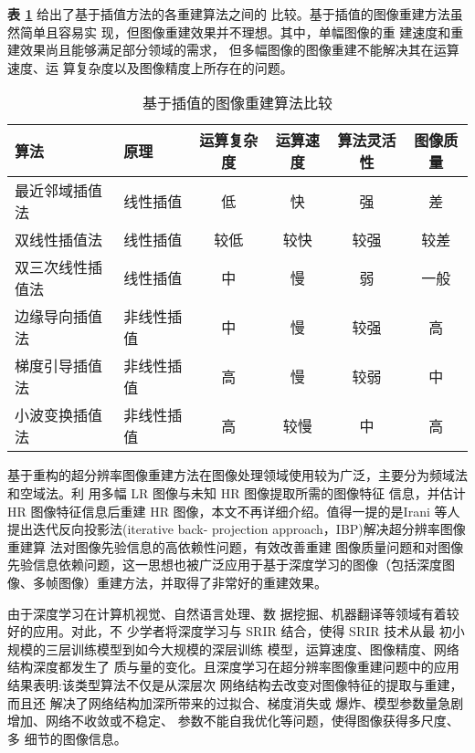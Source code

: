 \textbf{表 \ref{tab:tab1}} 给出了基于插值方法的各重建算法之间的 比较。基于插值的图像重建方法虽然简单且容易实 现，但图像重建效果并不理想。其中，单幅图像的重 建速度和重建效果尚且能够满足部分领域的需求， 但多幅图像的图像重建不能解决其在运算速度、运 算复杂度以及图像精度上所存在的问题。

\begin{table}[!ht]
\centering
\caption{基于插值的图像重建算法比较}
\begin{adjustbox}{width=\linewidth}
\begin{tabular}{llcccc}
\toprule
	算法 &  原理 &  运算复杂度 &  运算速度 &  算法灵活性 &  图像质量 \\ \hline
	 最近邻域插值法 &  线性插值 &  低 &  快 &  强 &  差 \\ \hline
	 双线性插值法 &  线性插值 &  较低 &  较快 &  较强 &  较差 \\ \hline
	 双三次线性插值法 &  线性插值 &  中 &  慢 &  弱 &  一般 \\ \hline
	 边缘导向插值法 &  非线性插值 &  中 &  慢 &  较强 &  高 \\ \hline
	 梯度引导插值法 &  非线性插值 &  高 &  慢 &  较弱 &  中 \\ \hline
	 小波变换插值法 &  非线性插值 &  高 &  较慢 &  中 &  高 \\ \bottomrule
\end{tabular}
\end{adjustbox}
\label{tab:tab1}
\end{table}

基于重构的超分辨率图像重建方法在图像处理领域使用较为广泛，主要分为频域法和空域法。利 用多幅 LR 图像与未知 HR 图像提取所需的图像特征 信息，并估计 HR 图像特征信息后重建 HR 图像，本文不再详细介绍。值得一提的是Irani 等人 \cite{DBLP:journals/cvgip/IraniP91}提出迭代反向投影法(iterative back- projection approach，IBP)解决超分辨率图像重建算 法对图像先验信息的高依赖性问题，有效改善重建 图像质量问题和对图像先验信息依赖问题，这一思想也被广泛应用于基于深度学习的图像（包括深度图像、多帧图像）重建方法，并取得了非常好的重建效果。

由于深度学习在计算机视觉、自然语言处理、数 据挖掘、机器翻译等领域有着较好的应用。对此，不 少学者将深度学习与 SRIR 结合，使得 SRIR 技术从最 初小规模的三层训练模型到如今大规模的深层训练 模型，运算速度、图像精度、网络结构深度都发生了 质与量的变化。且深度学习在超分辨率图像重建问题中的应用结果表明:该类型算法不仅是从深层次 网络结构去改变对图像特征的提取与重建，而且还 解决了网络结构加深所带来的过拟合、梯度消失或 爆炸、模型参数量急剧增加、网络不收敛或不稳定、 参数不能自我优化等问题，使得图像获得多尺度、多 细节的图像信息。


